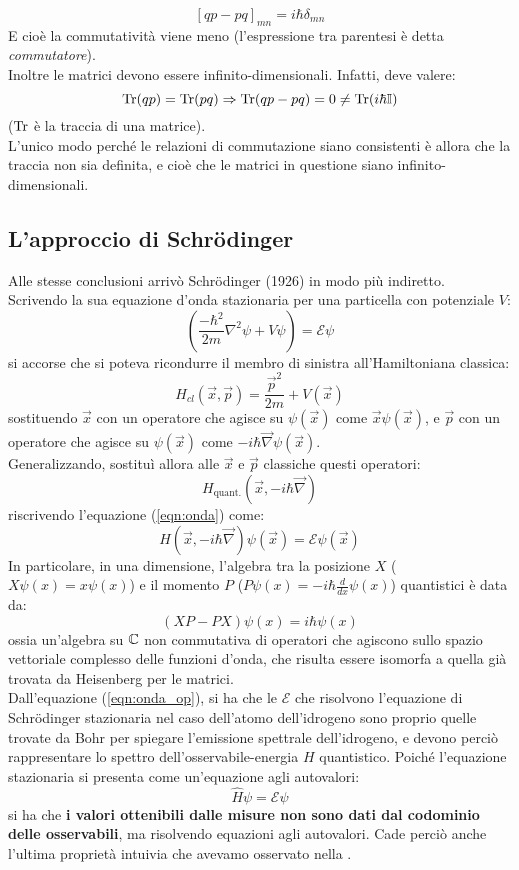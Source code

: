 \documentclass[FisicaTeorica.tex]{subfiles}
\begin{document}
\[
[qp - pq]_{mn} = i\hbar \delta_{mn}
\]
E cioè la commutatività viene meno (l'espressione tra parentesi è detta \textit{commutatore}).\\
Inoltre le matrici devono essere infinito-dimensionali. Infatti, deve valere:
\[
\operatorname{Tr}(qp) = \operatorname{Tr}(pq) \Rightarrow \operatorname{Tr}(qp-pq) = 0 \neq \operatorname{Tr}(i\hbar \mathbb{I})
\]
($\operatorname{Tr}$ è la traccia di una matrice).\\
L'unico modo perché le relazioni di commutazione siano consistenti è allora che la traccia non sia definita, e cioè che le matrici in questione siano infinito-dimensionali.\\

\subsection{L'approccio di Schrödinger}
Alle stesse conclusioni arrivò Schrödinger (1926) in modo più indiretto.\\
Scrivendo la sua equazione d'onda stazionaria per una particella con potenziale $V$:
\begin{equation}
    \left(\frac{{-\hbar}^2}{2m}\nabla^2\psi+V\psi\right)=\mathcal{E}\psi
    \label{eqn:onda}
\end{equation}
si accorse che si poteva ricondurre il membro di sinistra all'Hamiltoniana classica: 
\[H_{cl}\left(\vec{x},\vec{p}\right)=\frac{{\vec{p}}^2}{2m}+V(\vec{x})\]
sostituendo $\vec{x}$ con un operatore che agisce su $\psi(\vec{x})$ come $\vec{x}\psi(\vec{x})$, e $\vec{p}$ con un operatore che agisce su $\psi(\vec{x})$ come $-i\hbar \vec{\nabla}\psi(\vec{x})$.\\
Generalizzando, sostituì allora alle $\vec{x}$ e $\vec{p}$ classiche questi operatori:
\[
H_{\text{quant.}}(\vec{x}, -i\hbar \vec{\nabla})
\]
riscrivendo l'equazione (\ref{eqn:onda}) come:
\begin{equation}
H\left(\vec{x},-i\hbar\vec{\nabla}\right)\psi\left(\vec{x}\right)=\mathcal{E}\psi\left(\vec{x}\right)
\label{eqn:onda_op}
\end{equation}
In particolare, in una dimensione, l'algebra tra la posizione $X$ ($X\psi(x) = x\psi(x)$) e il momento $P$ ($P\psi(x) = -i\hbar \frac{d}{dx}\psi(x)$) quantistici è data da:
\[
(XP-PX)\psi(x)=i\hbar\psi(x)
\]
ossia un'algebra su $\mathbb{C}$ non commutativa di operatori che agiscono sullo spazio vettoriale complesso delle funzioni d'onda, che risulta essere isomorfa a quella già trovata da Heisenberg per le matrici.\\
Dall'equazione (\ref{eqn:onda_op}), si ha che le $\mathcal{E}$ che risolvono l'equazione di Schrödinger stazionaria nel caso dell'atomo dell'idrogeno sono proprio quelle trovate da Bohr per spiegare l'emissione spettrale dell'idrogeno, e devono perciò rappresentare lo spettro dell'osservabile-energia $H$ quantistico. Poiché l'equazione stazionaria si presenta come un'equazione agli autovalori:
\[
\hat{H}\psi = \mathcal{E}\psi
\]
si ha che \textbf{i valori ottenibili dalle misure non sono dati dal codominio delle osservabili}, ma risolvendo equazioni agli autovalori. Cade perciò anche l'ultima proprietà intuivia che avevamo osservato nella \MC.\\
\end{document}
